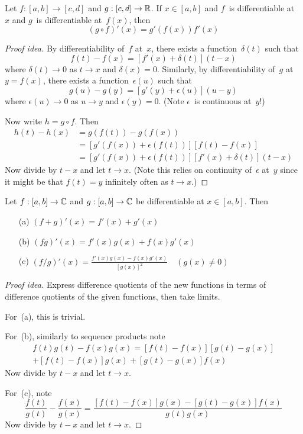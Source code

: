\begin{thm}
Let \(f:[a,b]\to[c,d]\) and \(g:[c,d]\to\mathbb{R}\). If \(x\in[a,b]\) and \(f\)~is differentiable at~\(x\) and \(g\)~is differentiable at~\(f(x)\), then
\[(g\circ f)'(x)=g'(f(x))f'(x)\]
\end{thm}
\begin{proof}[Proof idea]
By differentiability of~\(f\) at~\(x\), there exists a function~\(\delta(t)\) such that
\[f(t)-f(x)=[f'(x)+\delta(t)](t-x)\]
where \(\delta(t)\to0\) as \(t\to x\) and \(\delta(x)=0\). Similarly, by differentiability of~\(g\) at \(y=f(x)\), there exists a function~\(\epsilon(u)\) such that
\[g(u)-g(y)=[g'(y)+\epsilon(u)](u-y)\]
where \(\epsilon(u)\to0\) as \(u\to y\) and \(\epsilon(y)=0\). (Note \(\epsilon\)~is continuous at~\(y\)!)

Now write \(h=g\circ f\). Then
\begin{align*}
h(t)-h(x)&=g(f(t))-g(f(x))\\
	&=[g'(f(x))+\epsilon(f(t))][f(t)-f(x)]\\
	&=[g'(f(x))+\epsilon(f(t))][f'(x)+\delta(t)](t-x)
\end{align*}
Now divide by \(t-x\) and let \(t\to x\). (Note this relies on continuity of~\(\epsilon\) at~\(y\) since it might be that \(f(t)=y\) infinitely often as \(t\to x\).)
\end{proof}

\begin{thm}
Let \(f:[a,b]\to\mathbb{C}\) and \(g:[a,b]\to\mathbb{C}\) be differentiable at \(x\in[a,b]\). Then
\begin{enumerate}[itemsep=0pt]
\item[(a)] \((f+g)'(x)=f'(x)+g'(x)\)
\item[(b)] \((fg)'(x)=f'(x)g(x)+f(x)g'(x)\)
\item[(c)] \((f/g)'(x)=\displaystyle\frac{f'(x)g(x)-f(x)g'(x)}{[g(x)]^2}\quad(g(x)\ne0)\)
\end{enumerate}
\end{thm}
\begin{proof}[Proof idea]
Express difference quotients of the new functions in terms of difference quotients of the given functions, then take limits.

For~(a), this is trivial.

For~(b), similarly to sequence products note
\begin{multline*}
f(t)g(t)-f(x)g(x)=[f(t)-f(x)][g(t)-g(x)]\\
	+[f(t)-f(x)]g(x)+[g(t)-g(x)]f(x)
\end{multline*}
Now divide by \(t-x\) and let \(t\to x\).

For~(c), note
\[\frac{f(t)}{g(t)}-\frac{f(x)}{g(x)}=\frac{[f(t)-f(x)]g(x)-[g(t)-g(x)]f(x)}{g(t)g(x)}\]
Now divide by \(t-x\) and let \(t\to x\).
\end{proof}

